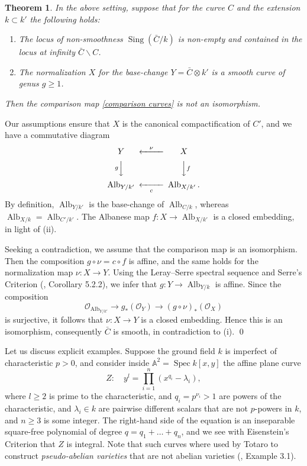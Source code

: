 \documentclass[oneside, 12pt]{amsart}
\newcommand\mylabel[1]{\label{#1}\marginpar{\vspace{-1ex}\medskip\medskip\footnotesize \tt #1}}
\renewcommand\mylabel[1]{\label{#1}}
\newtheorem{theorem}{Theorem}[section]
\theoremstyle{definition}
\theoremstyle{remark}
\renewcommand{\AA}{\mathbb{A}}
\newcommand{\Alb}{\operatorname{Alb}}
\renewcommand{\O}{\mathscr{O}}
\newcommand{\ra}{\rightarrow}
\newcommand{\Sing}{\operatorname{Sing}}
\newcommand{\Spec}{\operatorname{Spec}}
\begin{document}
\begin{theorem}
\mylabel{base change fails}
In the above setting, suppose that for the curve $C$ and the extension $k\subset k'$ the following holds:
\begin{enumerate}
\item The locus of non-smoothness   $\Sing(\bar{C}/k)$ is non-empty and contained in the locus at infinity $\bar{C}\smallsetminus C$.
\item The normalization  $X$ for the base-change $Y=\bar{C}\otimes k'$ is a smooth curve of genus $g\geq 1$.
\end{enumerate}
Then the comparison map \eqref{comparison curves} is not an isomorphism.
\end{theorem}

\proof
Our assumptions   ensure  that $X$ is  the canonical compactification of $C'$, and we have    a commutative diagram
$$
\begin{CD}
Y	@<\nu<<	X\\
@VgVV		@VVfV\\
\Alb_{Y/k'}	@<<c<	\Alb_{X/k'}.
\end{CD}
$$
By definition, $\Alb_{Y/k'}$ is the  base-change of $\Alb_{C/k}$, whereas $\Alb_{X/k}=\Alb_{C'/k'}$.  
The Albanese map $f:X\ra \Alb_{X/k'}$ is a closed embedding, in light of   (ii).

Seeking a contradiction, we assume that the comparison map is an isomorphism. 
Then the composition $g\circ \nu=c\circ f$ is affine, and the same holds for the normalization map $\nu:X\ra Y$.
Using the Leray--Serre spectral sequence and Serre's Criterion (\cite{EGA II}, Corollary 5.2.2), we infer that $g:Y\ra \Alb_{Y/k}$ is affine.
Since the composition 
$$
\O_{\Alb_{Y/k'}}\ra g_*(\O_Y)\ra (g\circ\nu)_*(\O_X)
$$
is surjective, it follows that $\nu:X\ra Y$ is a closed embedding. Hence this is an isomorphism,
consequently $\bar{C}$ is smooth, in contradiction to   (i).
\qed

\medskip
Let us discuss    explicit examples. Suppose the ground field $k$ is imperfect of characteristic $p>0$, 
and consider inside $\AA^2=\Spec k[x,y]$ the affine plane curve
$$
Z:\quad y^l = \prod_{i=1}^n (x^{q_i}-\lambda_i),
$$
where $l\geq 2$ is prime to  the characteristic,   and $q_i=p^{\nu_i}>1$ are powers of the characteristic, and $\lambda_i\in k$
are pairwise different scalars that are not $p$-powers in $k$, and  $n\geq 3$ is some   integer.
The right-hand side of the equation is  an inseparable   square-free polynomial of degree $q=q_1+\ldots+q_n$, 
and we see with Eisenstein's Criterion that $Z$ is integral. 
Note that such curves  where used by Totaro to construct  
\emph{pseudo-abelian varieties} that are not abelian varieties (\cite{Totaro 2013}, Example 3.1).
\end{document}
